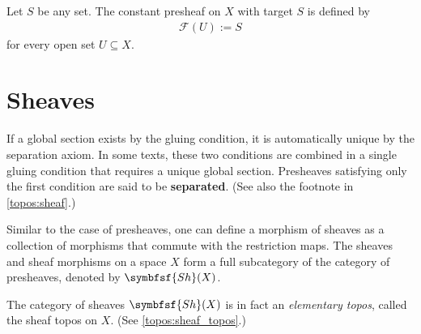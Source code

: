     \begin{example}\label{sheaf:constant_presheaf}
        Let $S$ be any set. The constant presheaf on $X$ with target $S$ is defined by
        \begin{gather}
            \mathcal{F}(U) := S
        \end{gather}
        for every open set $U\subseteq X$.
    \end{example}

\section{Sheaves}

    \begin{remark}
        If a global section exists by the gluing condition, it is automatically unique by the separation axiom. In some texts, these two conditions are combined in a single gluing condition that requires a unique global section. Presheaves satisfying only the first condition are said to be \textbf{separated}. (See also the footnote in \cref{topos:sheaf}.)
    \end{remark}

    \begin{notation}
        Similar to the case of presheaves, one can define a morphism of sheaves as a collection of morphisms that commute with the restriction maps. The sheaves and sheaf morphisms on a space $X$ form a full subcategory of the category of presheaves, denoted by $\symbfsf{Sh}(X)$.
    \end{notation}
    \begin{property}
        The category of sheaves $\symbfsf{Sh}(X)$ is in fact an \textit{elementary topos}, called the sheaf topos on $X$. (See \cref{topos:sheaf_topos}.)
    \end{property}

